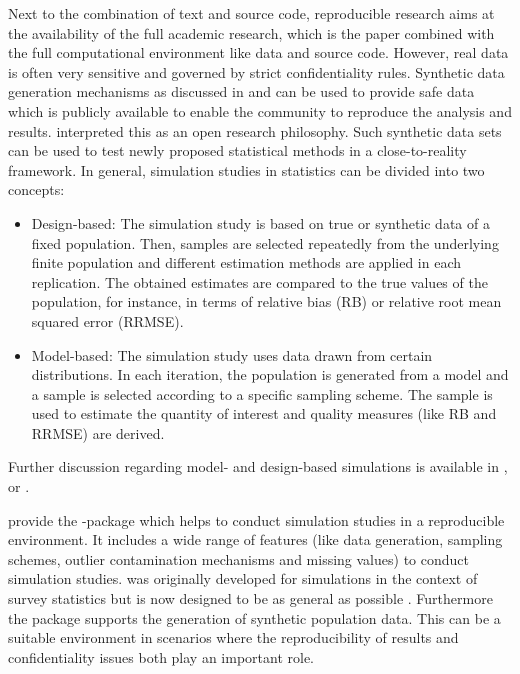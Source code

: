 \documentclass[article]{ajs}
\newcommand{\red}[1]{\color{red} #1 \color{black} }
\begin{document}
Next to the combination of text and source code, reproducible research aims at the availability of the full academic research, which is the paper combined with the full computational environment like data and source code. However, real data is often very sensitive and governed by strict confidentiality rules. \red{Synthetic data generation mechanisms as discussed in \cite{alfons2011} and \cite{Kol11} can be used to provide safe data which is publicly available to enable the community to reproduce the analysis and results.} \cite{Bur14} interpreted this as an open research philosophy. Such synthetic data sets can be used to test newly proposed statistical methods in a close-to-reality framework. 
In general, simulation studies in statistics can be divided into two concepts:
%
\begin{itemize}
\item Design-based: The simulation study is based on true or synthetic data of a fixed population. Then, samples are selected repeatedly from the underlying finite population and different estimation methods are applied in each replication. The obtained estimates are compared to the true values of the population, for instance, in terms of relative bias (RB) or relative root mean squared error (RRMSE).
\item Model-based: The simulation study uses data drawn from certain distributions. In each iteration, the population is generated from a model and a sample is selected according to a specific sampling scheme. The sample is used to estimate the quantity of interest and quality measures (like RB and RRMSE) are derived.  
\end{itemize}
Further discussion regarding model- and design-based simulations is available in \cite{Mue03}, \cite{Sal10} or \cite{Alf10}.

\red{\cite{Alf10} provide the -package \proglang{simFrame} which helps to conduct simulation studies in a reproducible environment. It includes a wide range of features (like data generation, sampling schemes, outlier contamination mechanisms and missing values) to conduct simulation studies. \proglang{simFrame} was originally developed for simulations in the context of survey statistics but is now designed to be as general as possible \citep[cf.][]{Alf10}. Furthermore the package \proglang{simPop} \citep{Alf14} supports the generation of synthetic population data. This can be a suitable environment in scenarios where the reproducibility of results and confidentiality issues both play an important role.}
\end{document}
